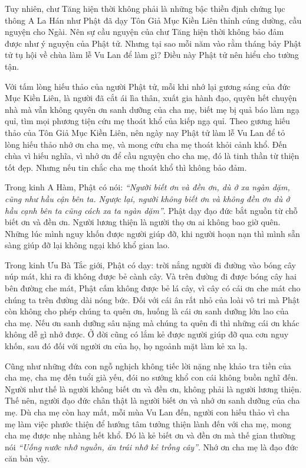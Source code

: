 \documentclass[
  12pt,
  oneside]{book}
\begin{document}
Tuy nhiên, chư Tăng hiện thời không phải là những bậc thiền định chứng lục thông A La Hán như Phật đã dạy Tôn Giả Mục Kiền Liên thỉnh cúng dường, cầu nguyện cho Ngài. Nên sự cầu nguyện của chư Tăng hiện thời không bảo đảm được như ý nguyện của Phật tử. Nhưng tại sao mỗi năm vào rằm tháng bảy Phật tử tụ hội về chùa làm lễ Vu Lan để làm gì? Điều này Phật tử nên hiểu cho tường tận.

Với tấm lòng hiếu thảo của người Phật tử, mỗi khi nhớ lại gương sáng của đức Mục Kiền Liên, là người đã cắt ái lìa thân, xuất gia hành đạo, quyên hết chuyện nhà mà vẫn không quyên ơn sanh dưỡng của cha mẹ, biết mẹ bị quả báo làm ngạ quỉ, tìm mọi phương tiện cứu mẹ thoát khổ của kiếp ngạ quỉ. Theo gương hiếu thảo của Tôn Giả Mục Kiền Liên, nên ngày nay Phật tử làm lễ Vu Lan để tỏ lòng hiếu thảo nhớ ơn cha mẹ, và mong cứu cha mẹ thoát khỏi cảnh khổ. Đến chùa vì hiếu nghĩa, vì nhớ ơn để cầu nguyện cho cha mẹ, đó là tinh thần từ thiện tốt đẹp. Nhưng nếu tin chắc cha mẹ thoát khổ thì không bảo đảm.

Trong kinh A Hàm, Phật có nói: \emph{``Người biết ơn và đền ơn, dù ở xa ngàn dặm, cũng như hầu cận bên ta. Ngược lại, người không biết ơn và không đền ơn dù ở hầu cạnh bên ta cũng cách xa ta ngàn dặm''}. Phật dạy đạo đức bắt nguồn từ chỗ biết ơn và đền ơn. Người lương thiện là người thọ ơn ai không bao giờ quên. Những lúc mình nguy khốn được người giúp đỡ, khi người hoạn nạn thì mình sẵn sàng giúp đỡ lại không ngại khó khổ gian lao.

Trong kinh Ưu Bà Tắc giới, Phật có dạy: trời nắng người đi đường vào bóng cây núp mát, khi ra đi không được bẻ cành cây. Và trên đường đi được bóng cây hai bên đường che mát, Phật cấm không được bẻ lá cây, vì cây có cái ơn che mát cho chúng ta trên đường dài nóng bức. Đối với cái ân rất nhỏ của loài vô tri mà Phật còn không cho phép chúng ta quên ơn, huống là cái ơn sanh dưỡng lớn lao của cha mẹ. Nếu ơn sanh dưỡng sâu nặng mà chúng ta quên đi thì những cái ơn khác không dễ gì nhớ được. Ở đời cũng có lắm kẻ được người giúp đỡ qua cơn nguy khốn, sau đó đối với người ơn của họ, họ ngoảnh mặt làm kẻ xa lạ.

Cũng như những đứa con ngỗ nghịch không tiếc lời nặng nhẹ khảo tra tiền của cha mẹ, cha mẹ đến tuổi già yếu, đói no sướng khổ con cái không buồn nghĩ đến. Người như thế là người không biết ơn và đền ơn, không phải là người lương thiện. Thế nên, người đạo đức chân thật là người biết ơn và nhớ ơn sanh dưỡng của cha mẹ. Dù cha mẹ còn hay mất, mỗi mùa Vu Lan đến, người con hiếu thảo vì cha mẹ làm việc phước thiện để hướng tâm tưởng thiện lành đến với cha mẹ, mong cha mẹ được nhẹ nhàng hết khổ. Đó là kẻ biết ơn và đền ơn mà thế gian thường nói \emph{``Uống nước nhớ nguồn, ăn trái nhớ kẻ trồng cây''}. Nhớ ơn cha mẹ là đạo đức căn bản vậy.
\end{document}
